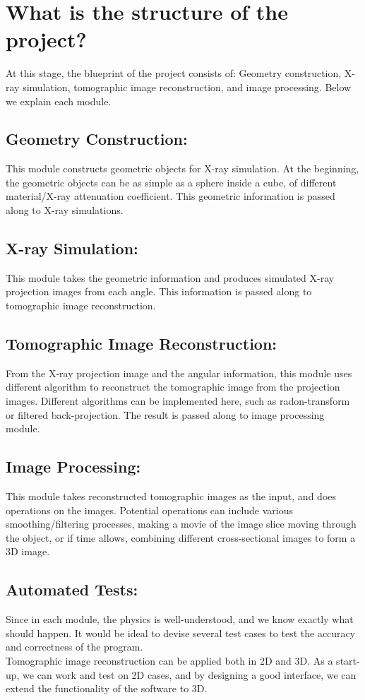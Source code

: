 \documentclass[11]{article}
\begin{document}
\section{What is the structure of the project?}
At this stage, the blueprint of the project consists of: Geometry construction, X-ray simulation, tomographic image reconstruction, and image processing. Below we explain each module.

	\subsection{Geometry Construction:}
		This module constructs geometric objects for X-ray simulation. At the beginning, the geometric objects can be as simple as a sphere inside a cube, of different material/X-ray attenuation coefficient. This geometric information is passed along to X-ray simulations.

	\subsection{X-ray Simulation:}
		This module takes the geometric information and produces simulated X-ray projection images from each angle. This information is passed along to tomographic image reconstruction.

	\subsection{Tomographic Image Reconstruction:}
		From the X-ray projection image and the angular information, this module uses different algorithm to reconstruct the tomographic image from the projection images. Different algorithms can be implemented here, such as radon-transform or filtered back-projection. The result is passed along to image processing module.

	\subsection{Image Processing:}
		This module takes reconstructed tomographic images as the input, and does operations on the images. Potential operations can include various smoothing/filtering processes, making a movie of the image slice moving through the object, or if time allows, combining different cross-sectional images to form a 3D image. 
	\subsection{Automated Tests:}
		Since in each module, the physics is well-understood, and we know exactly what should happen. It would be ideal to devise several test cases to test the accuracy and correctness of the program.\\ Tomographic image reconstruction can be applied both in 2D and 3D. As a start-up, we can work and test on 2D cases, and by designing a good interface, we can extend the functionality of the software to 3D.
	
\end{document}
